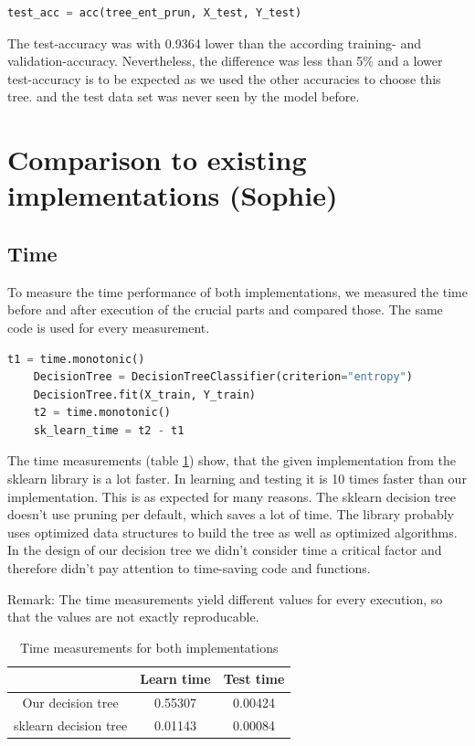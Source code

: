 \documentclass[12pt,a4paper]{scrartcl}		%
\begin{document}
\begin{lstlisting}[language=Python]
    test_acc = acc(tree_ent_prun, X_test, Y_test)
\end{lstlisting}

The test-accuracy was with 0.9364 lower than the according training- and validation-accuracy.
Nevertheless, the difference was less than 5\% and a lower test-accuracy is to be expected as we used the other 
accuracies to choose this tree. and the test data set was never seen by the model before. 

\section{Comparison to existing implementations (Sophie)}
\subsection{Time}
To measure the time performance of both implementations, we measured the time before and after execution of the 
crucial parts and compared those. The same code is used for every measurement.
\begin{lstlisting}[language=Python]
    t1 = time.monotonic()
    DecisionTree = DecisionTreeClassifier(criterion="entropy")
    DecisionTree.fit(X_train, Y_train)
    t2 = time.monotonic()
    sk_learn_time = t2 - t1
\end{lstlisting}
The time measurements (table \ref{tbl:time}) show, that the given implementation from the sklearn library is a lot faster. In learning 
and testing it is 10 times faster than our implementation. This is as expected for many reasons.
The sklearn decision tree doesn't use pruning per default, which saves a lot of time. The library probably uses 
optimized data structures to build the tree as well as optimized algorithms. 
In the design of our decision tree we didn't consider time a critical factor and therefore didn't pay attention 
to time-saving code and functions.

Remark: The time measurements yield different values for every execution, so that the values are not exactly 
reproducable.

\begin{table}
    \centering
    \begin{tabular}{|c|c|c|}
        \hline
         & Learn time & Test time \\
        \hline
        Our decision tree & 0.55307 & 0.00424 \\
        sklearn decision tree & 0.01143 & 0.00084 \\
        \hline
    \end{tabular}
    \caption{Time measurements for both implementations}
    \label{tbl:time}
\end{table}
\end{document}
